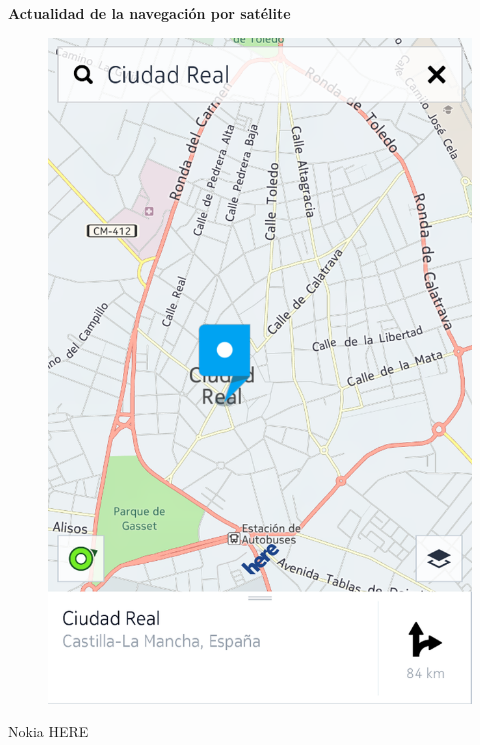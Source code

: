 \begin{slide}
\begin{block}{\textbf{Actualidad de la navegación por satélite}}
\begin{center}
\begin{minipage}[b]{0.3\linewidth}
\begin{center}
\begin{figure}
          \includegraphics[height=0.6\textheight]{img/heremaps.png}
        \end{figure}
        Nokia HERE
      \end{center}
    \end{minipage}
  \end{center}
  \end{block}
\end{slide}

